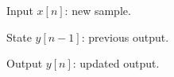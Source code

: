 \begin{notepanels}[columns=3]
  \begin{notepanel}{Input} $x[n]$: new sample. \end{notepanel}
  \begin{notepanel}{State} $y[n-1]$: previous output. \end{notepanel}
  \begin{notepanel}{Output} $y[n]$: updated output. \end{notepanel}
\end{notepanels}
